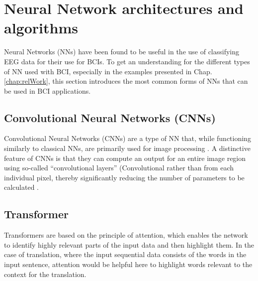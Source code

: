 \section{Neural Network architectures and algorithms}

Neural Networks (NNs) have been found to be useful in the use of classifying EEG data for their use for BCIs. %
To get an understanding for the different types of NN used with BCI, especially in the examples presented in Chap. \ref{chap:relWork}, this section introduces the most common forms of NNs that can be used in BCI applications. %

\subsection{Convolutional Neural Networks (CNNs)}

Convolutional Neural Networks (CNNs) are a type of NN that, while functioning similarly to classical NNs, are primarily
used for image processing \cite{oshea-2015}. %
A distinctive feature of CNNs is that they can compute an output for an entire image region
using so-called “convolutional layers” (Convolutional rather than from each individual pixel, thereby significantly
reducing the number of parameters to be calculated \cite{oshea-2015}. %


\subsection{Transformer}

Transformers are based on the principle of \glqq attention\grqq, which enables the network to identify highly relevant parts of the input data and then highlight them. %
In the case of translation, where the input sequential data consists of the words in the input sentence, attention would be helpful here to highlight words relevant to the context for the translation.

